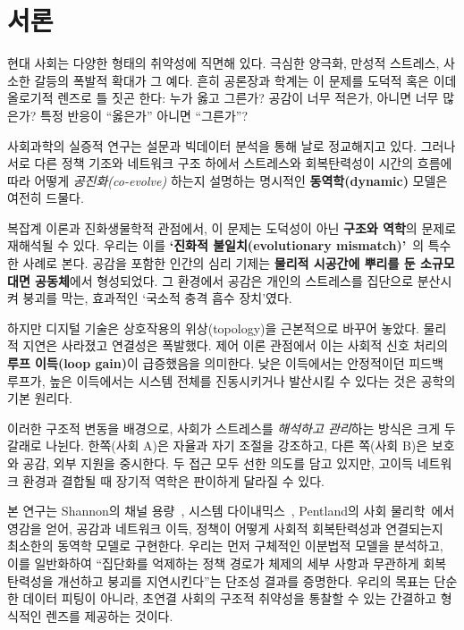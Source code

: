 \documentclass[11pt]{article}
\theoremstyle{plain}
\begin{document}
\section{서론}

현대 사회는 다양한 형태의 취약성에 직면해 있다. 극심한 양극화, 만성적 스트레스, 사소한 갈등의 폭발적 확대가 그 예다.
흔히 공론장과 학계는 이 문제를 도덕적 혹은 이데올로기적 렌즈로 틀 짓곤 한다:
누가 옳고 그른가?  
공감이 너무 적은가, 아니면 너무 많은가?  
특정 반응이 ``옳은가'' 아니면 ``그른가''?

사회과학의 실증적 연구는 설문과 빅데이터 분석을 통해 날로 정교해지고 있다.
그러나 서로 다른 정책 기조와 네트워크 구조 하에서 스트레스와 회복탄력성이 시간의 흐름에 따라 어떻게 \emph{공진화(co-evolve)} 하는지 설명하는 명시적인 \textbf{동역학(dynamic)} 모델은 여전히 드물다.

복잡계 이론과 진화생물학적 관점에서, 이 문제는 도덕성이 아닌 \textbf{구조와 역학}의 문제로 재해석될 수 있다.
우리는 이를 \textbf{`진화적 불일치(evolutionary mismatch)'}~\cite{lloyd2011evolutionary}의 특수한 사례로 본다.
공감을 포함한 인간의 심리 기제는 \textbf{물리적 시공간에 뿌리를 둔 소규모 대면 공동체}에서 형성되었다.
그 환경에서 공감은 개인의 스트레스를 집단으로 분산시켜 붕괴를 막는, 효과적인 `국소적 충격 흡수 장치'였다.

하지만 디지털 기술은 상호작용의 위상(topology)을 근본적으로 바꾸어 놓았다.
물리적 지연은 사라졌고 연결성은 폭발했다.
제어 이론 관점에서 이는 사회적 신호 처리의 \textbf{루프 이득(loop gain)}이 급증했음을 의미한다.
낮은 이득에서는 안정적이던 피드백 루프가, 높은 이득에서는 시스템 전체를 진동시키거나 발산시킬 수 있다는 것은 공학의 기본 원리다.

이러한 구조적 변동을 배경으로, 사회가 스트레스를 \emph{해석하고 관리}하는 방식은 크게 두 갈래로 나뉜다.
한쪽(사회 A)은 자율과 자기 조절을 강조하고, 다른 쪽(사회 B)은 보호와 공감, 외부 지원을 중시한다.
두 접근 모두 선한 의도를 담고 있지만, 고이득 네트워크 환경과 결합될 때 장기적 역학은 판이하게 달라질 수 있다.

본 연구는 Shannon의 채널 용량~\cite{shannon1948}, 시스템 다이내믹스~\cite{forrester1961,forrester1971}, Pentland의 사회 물리학~\cite{pentland2014}에서 영감을 얻어, 공감과 네트워크 이득, 정책이 어떻게 사회적 회복탄력성과 연결되는지 최소한의 동역학 모델로 구현한다.
우리는 먼저 구체적인 이분법적 모델을 분석하고, 이를 일반화하여 ``집단화를 억제하는 정책 경로가 체제의 세부 사항과 무관하게 회복탄력성을 개선하고 붕괴를 지연시킨다''는 단조성 결과를 증명한다.
우리의 목표는 단순한 데이터 피팅이 아니라, 초연결 사회의 구조적 취약성을 통찰할 수 있는 간결하고 형식적인 렌즈를 제공하는 것이다.
\end{document}
